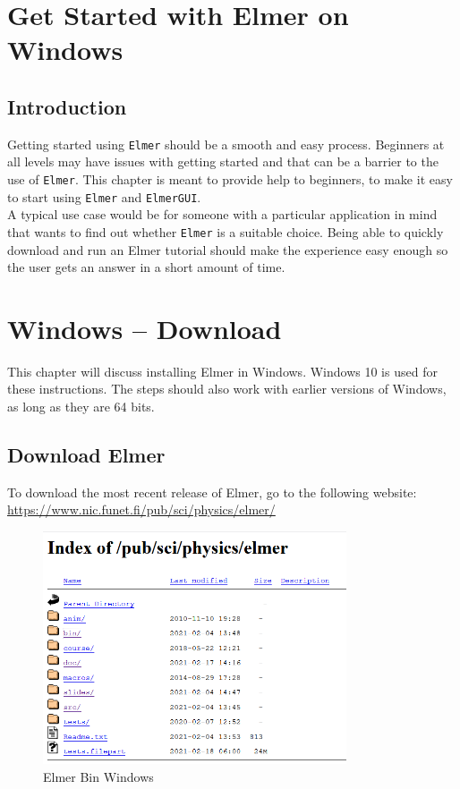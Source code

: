 \chapter{Get Started with Elmer on Windows}

\section{Introduction}

Getting started using \texttt{Elmer} should be a smooth and easy process.  Beginners at all levels may have issues with getting started and that can be a barrier to the use of  \texttt{Elmer}.  This chapter is meant to provide help to beginners, to make it easy to start using \texttt{Elmer} and \texttt{ElmerGUI}.\\

A typical use case would be for someone with a particular application in mind that wants to find out whether \texttt{Elmer} is a suitable choice.  Being able to quickly download and run an Elmer tutorial should make the experience easy enough so the user gets an answer in a short amount of time.


\chapter{Windows -- Download}

This chapter will discuss installing Elmer in Windows.  Windows 10 is used for these instructions.  The steps should also work with earlier versions of Windows, as long as they are 64 bits.

\section{Download Elmer}

To download the most recent release of Elmer, go to the following website:\\

\url{https://www.nic.funet.fi/pub/sci/physics/elmer/}

\begin{figure}[H]
\centering
\includegraphics[width=0.8\textwidth]{elmer}
\caption{Elmer Bin Windows}\label{fg:elmer}
\end{figure}

